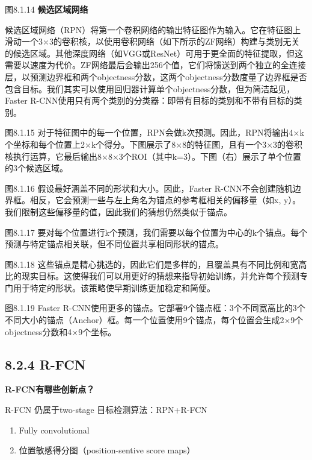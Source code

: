 图8.1.14 \textbf{候选区域网络}

候选区域网络（RPN）将第一个卷积网络的输出特征图作为输入。它在特征图上滑动一个3×3的卷积核，以使用卷积网络（如下所示的ZF网络）构建与类别无关的候选区域。其他深度网络（如VGG或ResNet）可用于更全面的特征提取，但这需要以速度为代价。ZF网络最后会输出256个值，它们将馈送到两个独立的全连接层，以预测边界框和两个objectness分数，这两个objectness分数度量了边界框是否包含目标。我们其实可以使用回归器计算单个objectness分数，但为简洁起见，Faster
R-CNN使用只有两个类别的分类器：即带有目标的类别和不带有目标的类别。

图8.1.15
对于特征图中的每一个位置，RPN会做k次预测。因此，RPN将输出4×k个坐标和每个位置上2×k个得分。下图展示了8×8的特征图，且有一个3×3的卷积核执行运算，它最后输出8×8×3个ROI（其中k=3）。下图（右）展示了单个位置的3个候选区域。

图8.1.16 假设最好涵盖不同的形状和大小。因此，Faster
R-CNN不会创建随机边界框。相反，它会预测一些与左上角名为锚点的参考框相关的偏移量（如x,
y）。我们限制这些偏移量的值，因此我们的猜想仍然类似于锚点。

图8.1.17
要对每个位置进行k个预测，我们需要以每个位置为中心的k个锚点。每个预测与特定锚点相关联，但不同位置共享相同形状的锚点。

图8.1.18
这些锚点是精心挑选的，因此它们是多样的，且覆盖具有不同比例和宽高比的现实目标。这使得我们可以用更好的猜想来指导初始训练，并允许每个预测专门用于特定的形状。该策略使早期训练更加稳定和简便。

图8.1.19 Faster
R-CNN使用更多的锚点。它部署9个锚点框：3个不同宽高比的3个不同大小的锚点（Anchor）框。每一个位置使用9个锚点，每个位置会生成2×9个objectness分数和4×9个坐标。

\subsection{8.2.4 R-FCN}\label{r-fcn}

\textbf{R-FCN有哪些创新点？}

R-FCN 仍属于two-stage 目标检测算法：RPN+R-FCN

\begin{enumerate}
\def\labelenumi{\arabic{enumi}.}
\item
  Fully convolutional
\item
  位置敏感得分图（position-sentive score maps）
\end{enumerate}

